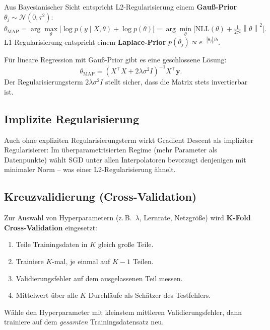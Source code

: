 \documentclass[11pt]{article}
\theoremstyle{csthm}
\theoremstyle{csdef}
\newcommand{\N}{\mathcal{N}}
\newcommand{\norm}[1]{\left\|#1\right\|}
\newcommand{\T}{^\top}
\begin{document}
\begin{tcolorbox}[defstyle]
Aus Bayesianischer Sicht entspricht L2-Regularisierung einem
\textbf{Gauß-Prior} $\theta_j \sim \N(0, \tau^2)$:
\[
  \theta_\mathrm{MAP}
  = \arg\max_\theta \bigl[\log p(y \mid X,\theta) + \log p(\theta)\bigr]
  = \arg\min_\theta \bigl[\text{NLL}(\theta) + \tfrac{1}{2\tau^2}\norm{\theta}^2\bigr].
\]
L1-Regularisierung entspricht einem \textbf{Laplace-Prior}
$p(\theta_j) \propto e^{-|\theta_j|/b}$.
\end{tcolorbox}

Für lineare Regression mit Gauß-Prior gibt es eine geschlossene Lösung:
\begin{equation}
  \theta_\mathrm{MAP} = (X\T X + 2\lambda\sigma^2 I)^{-1} X\T \bm{y}.
\end{equation}
Der Regularisierungsterm $2\lambda\sigma^2 I$ stellt sicher, dass die Matrix
stets invertierbar ist.

\subsection{Implizite Regularisierung}

Auch ohne expliziten Regularisierungsterm wirkt Gradient Descent als
impliziter Regularisierer: Im überparametrisierten Regime (mehr Parameter
als Datenpunkte) wählt SGD unter allen Interpolatoren bevorzugt denjenigen
mit minimaler Norm -- was einer L2-Regularisierung ähnelt.

\subsection{Kreuzvalidierung (Cross-Validation)}

Zur Auswahl von Hyperparametern (z.\,B.\ $\lambda$, Lernrate, Netzgröße)
wird \textbf{K-Fold Cross-Validation} eingesetzt:
\begin{enumerate}
  \item Teile Trainingsdaten in $K$ gleich große Teile.
  \item Trainiere $K$-mal, je einmal auf $K-1$ Teilen.
  \item Validierungsfehler auf dem ausgelassenen Teil messen.
  \item Mittelwert über alle $K$ Durchläufe als Schätzer des Testfehlers.
\end{enumerate}
Wähle den Hyperparameter mit kleinstem mittleren Validierungsfehler, dann
trainiere auf dem \emph{gesamten} Trainingsdatensatz neu.

\end{document}
